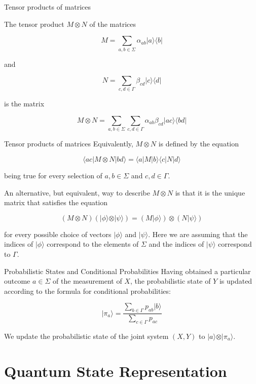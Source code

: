 \documentclass[12pt, aspectratio=169]{beamer}
\begin{document}
\begin{frame}{Tensor products of matrices}

The tensor product \(M\otimes N\) of the matrices

\[
M = \sum_{a,b\in\Sigma} \alpha_{ab} \vert a\rangle \langle b\vert
\]

and

\[
N = \sum_{c,d\in\Gamma} \beta_{cd} \vert c\rangle \langle d\vert
\]

is the matrix

\[
M\otimes N = \sum_{a,b\in\Sigma} \sum_{c,d\in\Gamma} \alpha_{ab} \beta_{cd} \vert ac \rangle \langle bd \vert
\]
\end{frame}
\begin{frame}{Tensor products of matrices}
Equivalently, \(M\otimes N\) is defined by the equation

\[
\langle ac \vert M \otimes N \vert bd\rangle = \langle a \vert M \vert b\rangle \langle c \vert N \vert d\rangle
\]

being true for every selection of \(a,b\in\Sigma\) and \(c,d\in\Gamma\).

An alternative, but equivalent, way to describe \(M\otimes N\) is that it is the unique matrix that satisfies the equation

\[
(M\otimes N)(\vert\phi\rangle\otimes\vert\psi\rangle) = (M\vert\phi\rangle)\otimes(N\vert\psi\rangle)
\]

for every possible choice of vectors \(\vert\phi\rangle\) and \(\vert\psi\rangle\). Here we are assuming that the indices of \(\vert\phi\rangle\) correspond to the elements of \(\Sigma\) and the indices of \(\vert\psi\rangle\) correspond to \(\Gamma\).


\end{frame}

\begin{frame}{Probabilistic States and Conditional Probabilities}
    Having obtained a particular outcome \(a\in\Sigma\) of the measurement of \(X\), the probabilistic state of \(Y\) is updated according to the formula for conditional probabilities:

    \[
    \vert \pi_a \rangle = \frac{\sum_{b\in\Gamma}p_{ab}\vert b\rangle}{\sum_{c\in\Gamma} p_{ac}}
    \]

    We update the probabilistic state of the joint system \((X,Y)\) to \(\vert a\rangle \otimes \vert\pi_a\rangle\).
\end{frame}


\section{Quantum State Representation}
\end{document}
